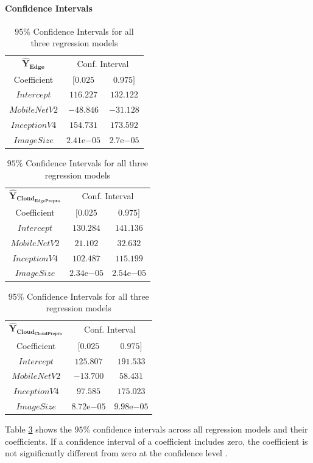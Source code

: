 \paragraph{Confidence Intervals}
\begin{table}[!htb]
\centering
\caption{$95\%$ Confidence Intervals for all three regression models}
\label{table:confidence}
\begin{center}
\begin{tabular}{@{}ccc@{}}
\toprule
\multicolumn{1}{c}{$\mathbf{\hat{Y}_{Edge}}$} & \multicolumn{2}{c}{Conf. Interval} \\ 
\cmidrule(l){2-3}
Coefficient & $[0.025$ & $0.975]$ \\\midrule
$Intercept$ & $116.227$ & $132.122$ \\
$MobileNetV2$ & $-48.846$ & $-31.128$ \\
$InceptionV$4 & $154.731$ & $173.592$ \\
$ImageSize$ & $2.41\mathrm{e}{-05}$ & $2.7\mathrm{e}{-05}$ \\\bottomrule
\end{tabular}
\end{center}
\vspace*{0.3cm}
\begin{tabular}{@{}ccc@{}}
\toprule
\multicolumn{1}{c}{$\mathbf{\hat{Y}_{Cloud_{EdgePrepro}}}$} & \multicolumn{2}{c}{Conf. Interval} \\ 
\cmidrule(l){2-3}
Coefficient & $[0.025$ & $0.975]$ \\\midrule
$Intercept$ & $130.284$ & $141.136$ \\
$MobileNetV2$ & $21.102$ & $32.632$ \\
$InceptionV4$ & $102.487$ & $115.199$ \\
$ImageSize$ & $2.34\mathrm{e}{-05}$ & $2.54\mathrm{e}{-05}$ \\\bottomrule
\end{tabular}
\quad
\begin{tabular}{@{}ccc@{}}
\toprule
\multicolumn{1}{c}{$\mathbf{\hat{Y}_{Cloud_{CloudPrepro}}}$} & \multicolumn{2}{c}{Conf. Interval} \\ 
\cmidrule(l){2-3}
Coefficient & $[0.025$ & $0.975]$ \\\midrule
$Intercept$ & $125.807$ & $191.533$ \\
$MobileNetV2$ & $-13.700$ & $58.431$ \\
$InceptionV4$ & $97.585$ & $175.023$ \\
$ImageSize $& $8.72\mathrm{e}{-05}$ & $9.98\mathrm{e}{-05}$ \\\bottomrule
\end{tabular}

\end{table}
Table \ref{table:confidence} shows the $95\%$ confidence intervals across all regression models and their coefficients.
If a confidence interval of a coefficient includes zero, the coefficient is not significantly different from zero at the confidence level \cite{books/daglib/0076234}.

